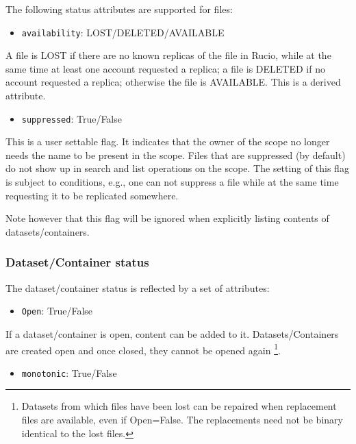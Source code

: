 \documentclass{atlasnote}
\newcommand{\code}[1]{\texttt{#1}}
\begin{document}
The following status attributes are supported for files:

\begin{itemize}
\item {}
\code{availability}: LOST/DELETED/AVAILABLE
\end{itemize}

A file is LOST if there are no known replicas of the file in Rucio, while at the same time at least one
account requested a replica; a file is DELETED if no account requested a replica; otherwise the file is AVAILABLE. This is a derived attribute.

\begin{itemize}
\item {}
\code{suppressed}: True/False
\end{itemize}

This is a user settable flag. It indicates that the owner of the scope no longer needs the name to be
present in the scope. Files that are suppressed (by default) do not show up in search and list
operations on the scope. The setting of this flag is subject to conditions, e.g., one can not suppress
a file while at the same time requesting it to be replicated somewhere.

Note however that this flag will be ignored when explicitly listing contents of datasets/containers.


\subsubsection{Dataset/Container status}
\label{sec:dataset-container-status}

\label{sec:status}
The dataset/container status is reflected by a set of attributes:

\begin{itemize}
\item {}
\code{Open}: True/False

\end{itemize}

If a dataset/container  is open, content can be added to it. Datasets/Containers
are created open and once closed, they cannot be opened again \footnote{Datasets
from which files have been lost can be repaired when replacement files are available, even
if Open=False. The replacements need not be binary identical to the lost files.}.

\begin{itemize}
\item {}
\code{monotonic}: True/False

\end{itemize}
\end{document}

